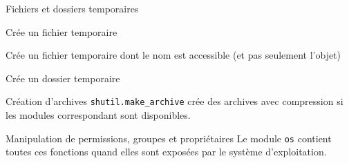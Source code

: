 \begin{frame}{Fichiers et dossiers temporaires}
  \begin{description}[<+->]
    \item[\texttt{tempfile.TemporaryFile}] Crée un fichier temporaire
    \item[\texttt{tempfile.NamedTemporaryFile}] Crée un fichier temporaire dont le nom est accessible (et pas seulement l'objet)
    \item[\texttt{tempfile.TemporaryDirectory}] Crée un dossier temporaire
  \end{description}

\end{frame}

\begin{frame}{Création d'archives}
  \texttt{shutil.make\_archive} crée des archives avec compression si les modules correspondant sont disponibles.
\end{frame}

\begin{frame}{Manipulation de permissions, groupes et propriétaires}
  Le module \texttt{os} contient toutes ces fonctions quand elles sont exposées par le système d'exploitation.
\end{frame}
